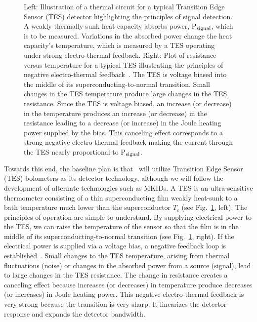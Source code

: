 \begin{figure}[t]
\vskip 0pt
\caption{Left: Illustration of a thermal circuit for a typical
  Transition Edge Sensor (TES) detector highlighting the principles of
  signal detection. A weakly thermally sunk heat capacity absorbs
  power, P$_{\rm signal}$, which is to be measured. Variations in the
  absorbed power change the heat capacity's temperature, which is
  measured by a TES operating under strong electro-thermal
  feedback. Right: Plot of resistance versus temperature for a typical
  TES illustrating the principles of negative electro-thermal
  feedback~\cite{irwin:1998}. The TES is voltage biased into the
  middle of its superconducting-to-normal transition. Small changes in
  the TES temperature produce large changes in the TES
  resistance. Since the TES is voltage biased, an increase (or
  decrease) in the temperature produces an increase (or decrease) in
  the resistance leading to a decrease (or increase) in the Joule
  heating power supplied by the bias. This canceling effect
  corresponds to a strong negative electro-thermal feedback making the
  current through the TES nearly proportional to P$_{\rm signal}$.}
\label{fig:TEScartoon}
\vskip -12pt
\end{figure}


Towards this end, the baseline plan is that \cmbexp\ will utilize Transition Edge Sensor (TES)
bolometers as its detector technology, although we will follow the development of alternate technologies such as MKIDs.  
A TES is an ultra-sensitive thermometer consisting of a thin
superconducting film weakly heat-sunk to a bath temperature much lower
than the superconductor $T_{c}$ (see Fig.~\ref{fig:TEScartoon},
left). The principles of operation are simple to understand. By
supplying electrical power to the TES, we can raise the temperature of
the sensor so that the film is in the middle of its
superconducting-to-normal transition (see Fig.~\ref{fig:TEScartoon},
right). If the electrical power is supplied via a voltage bias, a
negative feedback loop is established~\cite{irwin:1998}. Small changes
to the TES temperature, arising from thermal fluctuations (noise) or
changes in the absorbed power from a source (signal), lead to large
changes in the TES resistance. The change in resistance creates a
canceling effect because increases (or decreases) in temperature
produce decreases (or increases) in Joule heating power. This negative
electro-thermal feedback is very strong because the transition is very
sharp. It linearizes the detector response and expands the detector
bandwidth.


